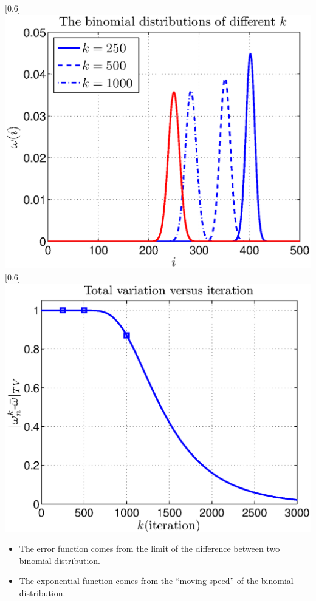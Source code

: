 \documentclass[dvips,landscape]{foils}
\renewcommand{\oursection}[1]{
\foilhead[-1.0cm]{#1}
}
\begin{document}
\centerline{
\scalebox{0.6}[0.6]{\includegraphics{deltaMexample2a}}
            \scalebox{0.6}[0.6]{\includegraphics{ehrenfasttv}}
}
\vspace{-1cm}
\begin{itemize}\setlength{\parskip}{0pt}  \setlength{\itemsep}{5pt} \setlength{\topsep}{0pt}
\item The error function comes from the limit of the difference between two binomial distribution.
\item The exponential function comes from the ``moving speed'' of the binomial distribution. 
\end{itemize}
\end{document}
